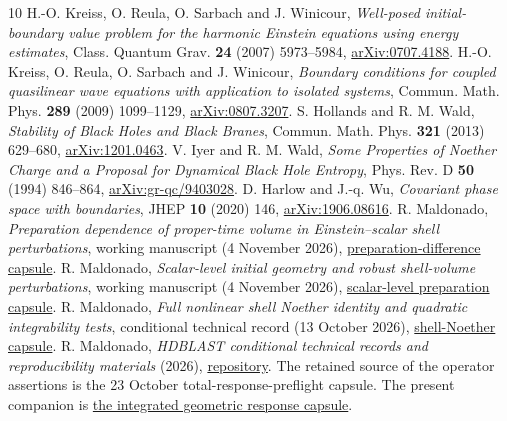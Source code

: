 \documentclass[11pt]{article}
\begin{document}
\begin{thebibliography}{10}
\footnotesize
\setlength{\itemsep}{2pt}
 H.-O. Kreiss, O. Reula, O. Sarbach and J. Winicour,
\emph{Well-posed initial-boundary value problem for the harmonic Einstein
equations using energy estimates}, Class. Quantum Grav. \textbf{24}
(2007) 5973--5984,
\href{https://arxiv.org/abs/0707.4188}{arXiv:0707.4188}.
 H.-O. Kreiss, O. Reula, O. Sarbach and J. Winicour,
\emph{Boundary conditions for coupled quasilinear wave equations with
application to isolated systems}, Commun. Math. Phys. \textbf{289}
(2009) 1099--1129,
\href{https://arxiv.org/abs/0807.3207}{arXiv:0807.3207}.
 S. Hollands and R. M. Wald,
\emph{Stability of Black Holes and Black Branes}, Commun. Math. Phys.
\textbf{321} (2013) 629--680,
\href{https://arxiv.org/abs/1201.0463}{arXiv:1201.0463}.
 V. Iyer and R. M. Wald,
\emph{Some Properties of Noether Charge and a Proposal for Dynamical Black
Hole Entropy}, Phys. Rev. D \textbf{50} (1994) 846--864,
\href{https://arxiv.org/abs/gr-qc/9403028}{arXiv:gr-qc/9403028}.
 D. Harlow and J.-q. Wu,
\emph{Covariant phase space with boundaries}, JHEP \textbf{10} (2020) 146,
\href{https://arxiv.org/abs/1906.08616}{arXiv:1906.08616}.
 R. Maldonado, \emph{Preparation dependence of
proper-time volume in Einstein--scalar shell perturbations}, working
manuscript (4 November 2026),
\href{https://github.com/maldonado-research/HDblast/tree/main/research/HDBLAST_SHELL_PREPARATION_DEPENDENCE_20261104}{preparation-difference capsule}.
 R. Maldonado, \emph{Scalar-level initial geometry and
robust shell-volume perturbations}, working manuscript (4 November 2026),
\href{https://github.com/maldonado-research/HDblast/tree/main/research/HDBLAST_INTRINSIC_PREPARATION_ROBUSTNESS_20261104}{scalar-level preparation capsule}.
 R. Maldonado,
\emph{Full nonlinear shell Noether identity and quadratic integrability
tests}, conditional technical record (13 October 2026),
\href{https://github.com/maldonado-research/HDblast/tree/main/research/HDBLAST_SHELL_NOETHER_20261013}{shell-Noether capsule}.
 R. Maldonado, \emph{HDBLAST conditional technical
records and reproducibility materials} (2026),
\href{https://github.com/maldonado-research/HDblast}{repository}.
The retained source of the operator assertions is the
23 October total-response-preflight capsule.
The present companion is
\href{https://github.com/maldonado-research/HDblast/tree/main/research/HDBLAST_H1_PREPARATION_RESPONSE_20261104}{the integrated geometric response capsule}.
\end{thebibliography}
\end{document}
